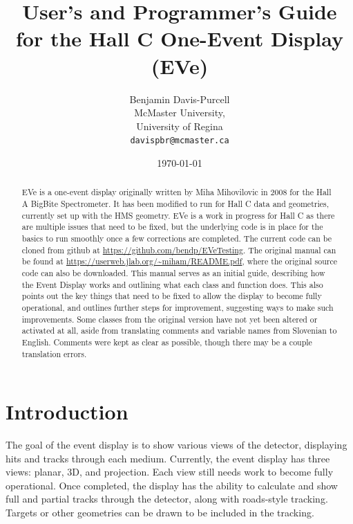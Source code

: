 \documentclass[12pt]{article}
\numberwithin{equation}{section}
\begin{document}
\title{User's and Programmer's Guide for the Hall C One-Event Display (EVe)}
\author{Benjamin Davis-Purcell\\
McMaster University,\\
University of Regina\\
\texttt{davispbr@mcmaster.ca}}
\date{\today}
\maketitle
\begin{abstract}
EVe is a one-event display originally written by Miha Mihovilovic in 2008 for the Hall A BigBite Spectrometer. It has been modified to run for Hall C data and geometries, currently set up with the HMS geometry. EVe is a work in progress for Hall C as there are multiple issues that need to be fixed, but the underlying code is in place for the basics to run smoothly once a few corrections are completed. The current code can be cloned from github at \url{https://github.com/bendp/EVeTesting}. The original manual can be found at \url{https://userweb.jlab.org/~miham/README.pdf}, where the original source code can also be downloaded. This manual serves as an initial guide, describing how the Event Display works and outlining what each class and function does. This also points out the key things that need to be fixed to allow the display to become fully operational, and outlines further steps for improvement, suggesting ways to make such improvements. Some classes from the original version have not yet been altered or activated at all, aside from translating comments and variable names from Slovenian to English. Comments were kept as clear as possible, though there may be a couple translation errors.
\end{abstract}

\pagebreak
\tableofcontents
\pagebreak

\section{Introduction}
The goal of the event display is to show various views of the detector, displaying hits and tracks through each medium. Currently, the event display has three views: planar, 3D, and projection. Each view still needs work to become fully operational. Once completed, the display has the ability to calculate and show full and partial tracks through the detector, along with roads-style tracking. Targets or other geometries can be drawn to be included in the tracking.
\end{document}
